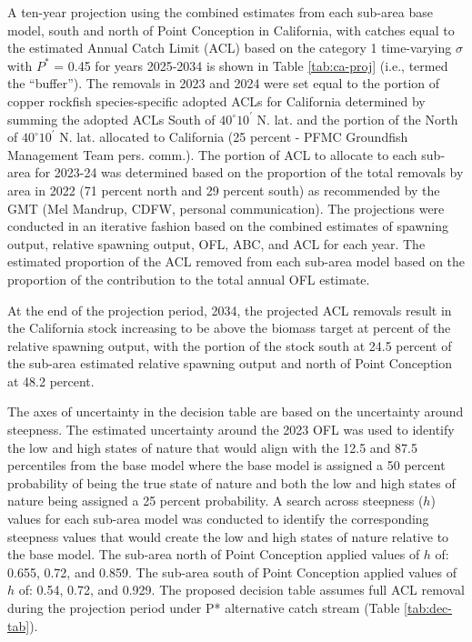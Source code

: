 \documentclass[11pt,
  letterpaper,
]{article}
\begin{document}
A ten-year projection using the combined estimates from each sub-area base model, south and north of Point Conception in California, with catches equal to the estimated Annual Catch Limit (ACL) based on the category 1 time-varying \(\sigma\) with \(P^*\) = 0.45 for years 2025-2034 is shown in Table \ref{tab:ca-proj} (i.e., termed the ``buffer''). The removals in 2023 and 2024 were set equal to the portion of copper rockfish species-specific adopted ACLs for California determined by summing the adopted ACLs South of $40^\circ 10^\prime$ N. lat. and the portion of the North of $40^\circ 10^\prime$ N. lat. allocated to California (25 percent - PFMC Groundfish Management Team pers. comm.). The portion of ACL to allocate to each sub-area for 2023-24 was determined based on the proportion of the total removals by area in 2022 (71 percent north and 29 percent south) as recommended by the GMT (Mel Mandrup, CDFW, personal communication). The projections were conducted in an iterative fashion based on the combined estimates of spawning output, relative spawning output, OFL, ABC, and ACL for each year. The estimated proportion of the ACL removed from each sub-area model based on the proportion of the contribution to the total annual OFL estimate.

At the end of the projection period, 2034, the projected ACL removals result in the California stock increasing to be above the biomass target at percent of the relative spawning output, with the portion of the stock south at 24.5 percent of the sub-area estimated relative spawning output and north of Point Conception at 48.2 percent.

The axes of uncertainty in the decision table are based on the uncertainty around steepness. The estimated uncertainty around the 2023 OFL was used to identify the low and high states of nature that would align with the 12.5 and 87.5 percentiles from the base model where the base model is assigned a 50 percent probability of being the true state of nature and both the low and high states of nature being assigned a 25 percent probability. A search across steepness (\(h\)) values for each sub-area model was conducted to identify the corresponding steepness values that would create the low and high states of nature relative to the base model. The sub-area north of Point Conception applied values of \(h\) of: 0.655, 0.72, and 0.859. The sub-area south of Point Conception applied values of \(h\) of: 0.54, 0.72, and 0.929. The proposed decision table assumes full ACL removal during the projection period under P* alternative catch stream (Table \ref{tab:dec-tab}).
\end{document}
